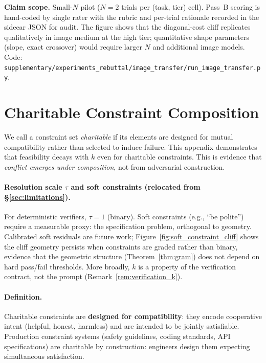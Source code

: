 \documentclass{article}
\theoremstyle{plain}
\theoremstyle{definition}
\theoremstyle{remark}
\begin{document}
\textbf{Claim scope.} Small-$N$ pilot ($N{=}2$ trials per (task, tier) cell). Pass~B scoring is hand-coded by single rater with the rubric and per-trial rationale recorded in the sidecar JSON for audit. The figure shows that the diagonal-cost cliff replicates qualitatively in image medium at the high tier; quantitative shape parameters (slope, exact crossover) would require larger $N$ and additional image models. Code: \texttt{supplementary/experiments\_rebuttal/image\_transfer/run\_image\_transfer.py}.



\section{Charitable Constraint Composition}\label{app:charity}\hypertarget{lim:soft}{}

We call a constraint set \emph{charitable} if its elements are designed for mutual compatibility rather than selected to induce failure. This appendix demonstrates that feasibility decays with $k$ even for charitable constraints. This is evidence that \emph{conflict emerges under composition}, not from adversarial construction.

\paragraph{Resolution scale $\tau$ and soft constraints (relocated from \S\ref{sec:limitations}).}
For deterministic verifiers, $\tau{=}1$ (binary). Soft constraints (e.g., ``be polite'') require a measurable proxy: the specification problem, orthogonal to geometry. Calibrated soft residuals are future work; Figure~\ref{fig:soft_constraint_cliff} shows the cliff geometry persists when constraints are graded rather than binary, evidence that the geometric structure (Theorem~\ref{thm:gram}) does not depend on hard pass/fail thresholds. More broadly, $k$ is a property of the verification contract, not the prompt (Remark~\ref{rem:verification_k}).

\paragraph{Definition.} Charitable constraints are \textbf{designed for compatibility}: they encode cooperative intent (helpful, honest, harmless) and are intended to be jointly satisfiable. Production constraint systems (safety guidelines, coding standards, API specifications) are charitable by construction: engineers design them expecting simultaneous satisfaction.
\end{document}
